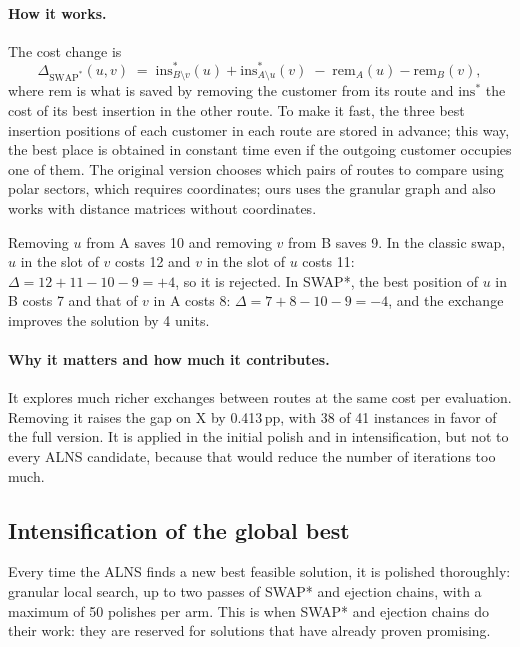 \documentclass[11pt,a4paper]{article}
\newcommand{\pp}{\,pp}
\begin{document}
\paragraph{How it works.} The cost change is
\begin{equation}
\Delta_{\mathrm{SWAP^{*}}}(u,v) \;=\; \mathrm{ins}^{*}_{B\setminus v}(u)+\mathrm{ins}^{*}_{A\setminus u}(v)
\;-\;\mathrm{rem}_{A}(u)-\mathrm{rem}_{B}(v),
\label{eq:swapstar}
\end{equation}
where $\mathrm{rem}$ is what is saved by removing the customer from its route and $\mathrm{ins}^*$
the cost of its best insertion in the other route. To make it fast, the three best insertion
positions of each customer in each route are stored in advance; this way, the best place is obtained
in constant time even if the outgoing customer occupies one of them. The original version chooses
which pairs of routes to compare using polar sectors, which requires coordinates; ours uses the
granular graph and also works with distance matrices without coordinates.

\begin{ejemplo}
Removing $u$ from A saves 10 and removing $v$ from B saves 9. In the classic swap, $u$ in the slot of
$v$ costs 12 and $v$ in the slot of $u$ costs 11: $\Delta=12+11-10-9=+4$, so it is rejected. In
SWAP*, the best position of $u$ in B costs 7 and that of $v$ in A costs 8: $\Delta=7+8-10-9=-4$, and
the exchange improves the solution by 4 units.
\end{ejemplo}

\paragraph{Why it matters and how much it contributes.} It explores much richer exchanges between
routes at the same cost per evaluation. Removing it raises the gap on X by 0.413\pp{}, with 38 of 41
instances in favor of the full version. It is applied in the initial polish and in intensification,
but not to every ALNS candidate, because that would reduce the number of iterations too much.

\subsection{Intensification of the global best}
Every time the ALNS finds a new best feasible solution, it is polished thoroughly: granular local
search, up to two passes of SWAP* and ejection chains, with a maximum of 50 polishes per arm. This is
when SWAP* and ejection chains do their work: they are reserved for solutions that have already
proven promising.
\end{document}
